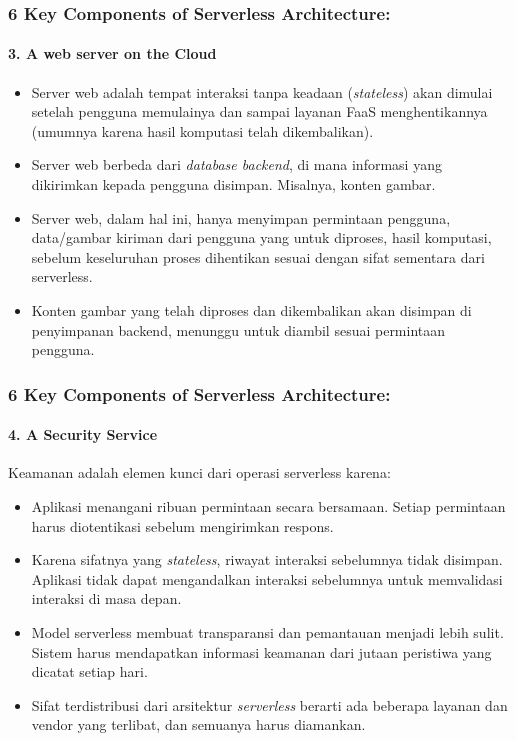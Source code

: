 \documentclass[aspectratio=169, table]{beamer}
\begin{document}
    \begin{frame}\frametitle{6 Key Components of Serverless Architecture:}
        \framesubtitle{3. A web server on the Cloud}
        \vspace{20pt}
        \begin{itemize}
            \item Server web adalah tempat interaksi tanpa keadaan (\textit{stateless}) akan dimulai setelah pengguna memulainya dan sampai layanan FaaS menghentikannya (umumnya karena hasil komputasi telah dikembalikan).
            \item Server web berbeda dari \textit{database backend}, di mana informasi yang dikirimkan kepada pengguna disimpan. Misalnya, konten gambar.
            \item Server web, dalam hal ini, hanya menyimpan  permintaan pengguna, data/gambar kiriman dari pengguna yang untuk diproses, hasil komputasi, sebelum keseluruhan proses dihentikan sesuai dengan sifat sementara dari serverless.
            \item Konten gambar yang telah diproses dan dikembalikan akan disimpan di penyimpanan backend, menunggu untuk diambil sesuai permintaan pengguna.
        \end{itemize}
    \end{frame}

    \begin{frame}\frametitle{6 Key Components of Serverless Architecture:}
        \framesubtitle{4. A Security Service}
        \vspace{20pt}
        Keamanan adalah elemen kunci dari operasi serverless karena:
        \begin{itemize}
            \item Aplikasi menangani ribuan permintaan secara bersamaan. Setiap permintaan harus diotentikasi sebelum mengirimkan respons.
            \item Karena sifatnya yang \textit{stateless}, riwayat interaksi sebelumnya tidak disimpan. Aplikasi tidak dapat mengandalkan interaksi sebelumnya untuk memvalidasi interaksi di masa depan.
            \item Model serverless membuat transparansi dan pemantauan menjadi lebih sulit. Sistem harus mendapatkan informasi keamanan dari jutaan peristiwa yang dicatat setiap hari.
            \item Sifat terdistribusi dari arsitektur \textit{serverless} berarti ada beberapa layanan dan vendor yang terlibat, dan semuanya harus diamankan.
        \end{itemize}
    \end{frame}
\end{document}
